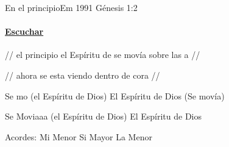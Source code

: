 \documentclass[12pt, spanish]{book}
\begin{document}
    \begin{song}{En el principio}{Em}
    {1991} %
    {}
    {Génesis 1:2} %
    {}
        \ifChordBk
        \paragraph{\mbox{}\hfill\protect\href{https://open.spotify.com/intl-es/track/5VNE3OmCdIAamzCp5iHr6d}{Escuchar}\mbox{}\hfill}
        \fi

        \begin{SBOpGroup}
            //  el principio el Espíritu de  se movía sobre las a //

            //  ahora se esta viendo dentro de  cora //
        \end{SBOpGroup}

        \begin{SBChorus}
            Se mo (el Espíritu de Dios) El Espíritu de Dios (Se movía)

            Se Moviaaa (el Espíritu de Dios) El Espíritu de Dios
        \end{SBChorus}

        \ifChordBk
        \begin{SBOpGroup}
            Acordes:\break
            \upchord{\Em}\qquad Mi Menor \hfill
            \upchord{\B}\qquad Si Mayor \hfill\null\break
            \upchord{\Am}\qquad La Menor \hfill\null\break
        \end{SBOpGroup}
        \fi
    \end{song}
\end{document}
